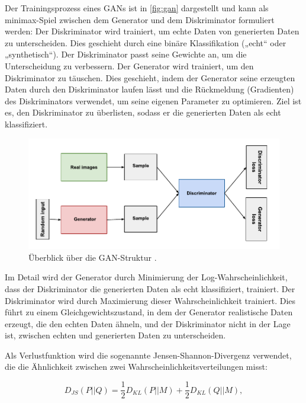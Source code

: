 Der Trainingsprozess eines GANs ist in \autoref{fig:gan} dargestellt und kann als minimax-Spiel zwischen dem Generator und dem Diskriminator formuliert werden: Der Diskriminator wird trainiert, um echte Daten von generierten Daten zu unterscheiden. Dies geschieht durch eine binäre Klassifikation („echt“ oder „synthetisch“). Der Diskriminator passt seine Gewichte an, um die Unterscheidung zu verbessern. Der Generator wird trainiert, um den Diskriminator zu täuschen. Dies geschieht, indem der Generator seine erzeugten Daten durch den Diskriminator laufen lässt und die Rückmeldung (Gradienten) des Diskriminators verwendet, um seine eigenen Parameter zu optimieren. Ziel ist es, den Diskriminator zu überlisten, sodass er die generierten Daten als echt klassifiziert.

\begin{figure}[h]
	\includegraphics[width=\textwidth]{figure_gan.pdf}
	\caption[Überblick über die GAN-Struktur.]{Überblick über die GAN-Struktur \parencite{GoogleDev2022ganfigure}.}
	\label{fig:gan}
\end{figure}

Im Detail wird der Generator durch Minimierung der Log-Wahrscheinlichkeit, dass der Diskriminator die generierten Daten als echt klassifiziert, trainiert. Der Diskriminator wird durch Maximierung dieser Wahrscheinlichkeit trainiert. Dies führt zu einem Gleichgewichtszustand, in dem der Generator realistische Daten erzeugt, die den echten Daten ähneln, und der Diskriminator nicht in der Lage ist, zwischen echten und generierten Daten zu unterscheiden.

Als Verlustfunktion wird die sogenannte Jensen-Shannon-Divergenz verwendet, die die Ähnlichkeit zwischen zwei Wahrscheinlichkeitsverteilungen misst:

\begin{equation}
	D_{JS}(P||Q) = \frac{1}{2} D_{KL}(P||M) + \frac{1}{2} D_{KL}(Q||M),
	\label{eq:js-divergence}
\end{equation}

